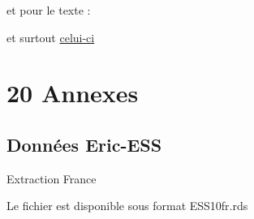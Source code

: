 \documentclass[
]{book}
\begin{document}
et pour le texte :

et surtout \href{https://benaventc.github.io/NLPBook/machine-learning-supervis\%C3\%A9-et-nlp.html}{celui-ci}

\hypertarget{annexes}{%
\chapter{20 Annexes}\label{annexes}}

\hypertarget{donnuxe9es-eric-ess}{%
\section{Données Eric-ESS}\label{donnuxe9es-eric-ess}}

Extraction France

Le fichier est disponible sous format ESS10fr.rds
\end{document}
